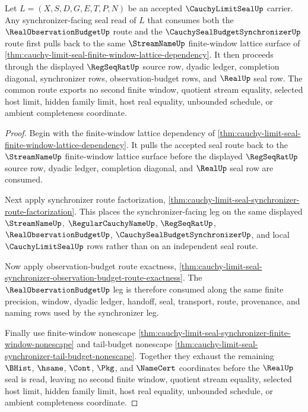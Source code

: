\begin{theorem}
\label{thm:cauchy-limit-seal-common-window-budget-synchronizer-exhaustion}
Let $L=(X,S,D,G,E,T,P,N)$ be an accepted $\CauchyLimitSealUp$ carrier. Any synchronizer-facing seal read of $L$ that consumes both the $\RealObservationBudgetUp$ route and the $\CauchySealBudgetSynchronizerUp$ route first pulls back to the same $\StreamNameUp$ finite-window lattice surface of \autoref{thm:cauchy-limit-seal-finite-window-lattice-dependency}. It then proceeds through the displayed $\RegSeqRatUp$ source row, dyadic ledger, completion diagonal, synchronizer rows, observation-budget rows, and $\RealUp$ seal row. The common route exports no second finite window, quotient stream equality, selected host limit, hidden family limit, host real equality, unbounded schedule, or ambient completeness coordinate.
\end{theorem}
\begin{proof}
Begin with the finite-window lattice dependency of \autoref{thm:cauchy-limit-seal-finite-window-lattice-dependency}. It pulls the accepted seal route back to the $\StreamNameUp$ finite-window lattice surface before the displayed $\RegSeqRatUp$ source row, dyadic ledger, completion diagonal, and $\RealUp$ seal row are consumed.

Next apply synchronizer route factorization, \autoref{thm:cauchy-limit-seal-synchronizer-route-factorization}. This places the synchronizer-facing leg on the same displayed $\StreamNameUp$, $\RegularCauchyNameUp$, $\RegSeqRatUp$, $\RealObservationBudgetUp$, $\CauchySealBudgetSynchronizerUp$, and local $\CauchyLimitSealUp$ rows rather than on an independent seal route.

Now apply observation-budget route exactness, \autoref{thm:cauchy-limit-seal-synchronizer-observation-budget-route-exactness}. The $\RealObservationBudgetUp$ leg is therefore consumed along the same finite precision, window, dyadic ledger, handoff, seal, transport, route, provenance, and naming rows used by the synchronizer leg.

Finally use finite-window nonescape \autoref{thm:cauchy-limit-seal-synchronizer-finite-window-nonescape} and tail-budget nonescape \autoref{thm:cauchy-limit-seal-synchronizer-tail-budget-nonescape}. Together they exhaust the remaining $\BHist$, $\hsame$, $\Cont$, $\Pkg$, and $\NameCert$ coordinates before the $\RealUp$ seal is read, leaving no second finite window, quotient stream equality, selected host limit, hidden family limit, host real equality, unbounded schedule, or ambient completeness coordinate.
\end{proof}

